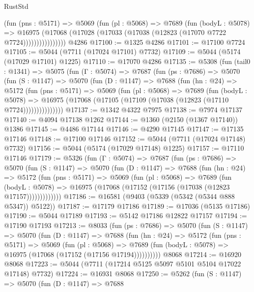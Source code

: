 \begin{lexlean}{RustStd}
\begin{coremodule}
                  (fun (pns : @5171) =>
                  @5069
                    (fun (pl : @5068) =>
                    @7689
                      (fun (bodyL : @5078) =>
                      @16975
                        (@17068 (@17028 (@17033 (@17038 (@12823 (@17070 @7722 @7724))))))))))))))))
    @4286
@17100 := @1325 @4286
@17101 := @17100 @7724
@17105 := @5044 (@7711 (@17024 @17101) @7732)
@17109 := @5044 (@5174 (@17029 @17101) @1225)
@17110 := @17070 @4286
@17135 := @5308
    (fun (tail0 : @1341) =>
    @5075
      (fun (Γ : @5074) =>
      @7687
        (fun (ps : @7686) =>
        @5070
          (fun (S : @1147) =>
          @5070
            (fun (D : @1147) =>
            @7688
              (fun (hn : @24) =>
              @5172
                (fun (pns : @5171) =>
                @5069
                  (fun (pl : @5068) =>
                  @7689
                    (fun (bodyL : @5078) =>
                    @16975 (@17068 (@17105 (@17109 (@17038 (@12823 (@17110 @7724)))))))))))))))
@17137 := @1342 @4322 @7975
@17138 := @7974 @17137
@17140 := @4094 @17138 @1262
@17144 := @1360 (@2150 (@1367 @17140)) @1386
@17145 := @4486 @17144
@17146 := @4290 @17145
@17147 := @17135 @17146
@17148 := @17100 @17146
@17152 := @5044 (@7711 (@17024 @17148) @7732)
@17156 := @5044 (@5174 (@17029 @17148) @1225)
@17157 := @17110 @17146
@17179 := @5326
    (fun (Γ : @5074) =>
    @7687
      (fun (ps : @7686) =>
      @5070
        (fun (S : @1147) =>
        @5070
          (fun (D : @1147) =>
          @7688
            (fun (hn : @24) =>
            @5172
              (fun (pns : @5171) =>
              @5069
                (fun (pl : @5068) =>
                @7689
                  (fun (bodyL : @5078) =>
                  @16975 (@17068 (@17152 (@17156 (@17038 (@12823 @17157)))))))))))))
@17186 := @16581 (@9403 (@5339 (@5342 (@5344 @888 @5347)) @5122))
@17187 := @17179 @17186
@17189 := @17036 (@5135 @17186)
@17190 := @5044 @17189
@17193 := @5142 @17186 @12822 @17157
@17194 := @17190 @17193
@17213 := @8033
    (fun (ps : @7686) =>
    @5070
      (fun (S : @1147) =>
      @5070
        (fun (D : @1147) =>
        @7688
          (fun (hn : @24) =>
          @5172
            (fun (pns : @5171) =>
            @5069
              (fun (pl : @5068) =>
              @7689 (fun (bodyL : @5078) => @16975 (@17068 (@17152 (@17156 @17194))))))))))
    @8068
@17214 := @16920 @8068
@17223 := @5044 (@7711 (@17214 @5125 @5097 @5101 @5104 @17022 @17148) @7732)
@17224 := @16931 @8068
@17250 := @5262
    (fun (S : @1147) =>
    @5070
      (fun (D : @1147) =>
      @7688

\end{coremodule}
\end{lexlean}
